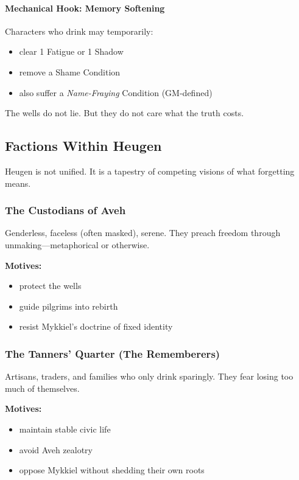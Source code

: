 \documentclass[11pt]{book}
\begin{document}
\paragraph{Mechanical Hook: Memory Softening}
Characters who drink may temporarily:
\begin{itemize}
    \item clear 1 Fatigue or 1 Shadow  
    \item remove a Shame Condition  
    \item also suffer a \emph{Name-Fraying} Condition (GM-defined)  
\end{itemize}

The wells do not lie.  
But they do not care what the truth costs.

\subsection{Factions Within Heugen}

Heugen is not unified. It is a tapestry of competing visions of what forgetting means.

\subsubsection{The Custodians of Aveh}
Genderless, faceless (often masked), serene.  
They preach freedom through unmaking---metaphorical or otherwise.

\textbf{Motives:}  
\begin{itemize}[leftmargin=*]
    \item protect the wells  
    \item guide pilgrims into rebirth  
    \item resist Mykkiel's doctrine of fixed identity  
\end{itemize}

\subsubsection{The Tanners' Quarter (The Rememberers)}
Artisans, traders, and families who only drink sparingly.  
They fear losing too much of themselves.

\textbf{Motives:}  
\begin{itemize}[leftmargin=*]
    \item maintain stable civic life  
    \item avoid Aveh zealotry  
    \item oppose Mykkiel without shedding their own roots  
\end{itemize}
\end{document}
